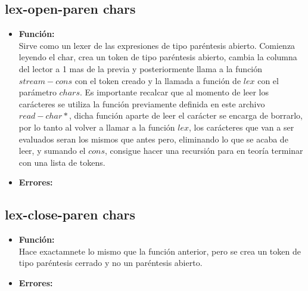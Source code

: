 \documentclass{article}
\begin{document}
\subsection{lex-open-paren chars}
\begin{itemize}
    \item \textbf{Función:} \\
    Sirve como un lexer de las expresiones de tipo paréntesis abierto. Comienza leyendo el char, crea un token de tipo paréntesis abierto, cambia la columna del lector a 1 mas de la previa y posteriormente llama a la función $stream-cons$ con el token creado y la llamada a función de $lex$ con el parámetro $chars$. Es importante recalcar que al momento de leer los carácteres se utiliza la función previamente definida en este archivo $read-char*$, dicha función aparte de leer el carácter se encarga de borrarlo, por lo tanto al volver a llamar a la función $lex$, los carácteres que van a ser evaluados seran los mismos que antes pero, eliminando lo que se acaba de leer, y sumando el $cons$, consigue hacer una recursión para en teoría terminar con una lista de tokens.
    \item \textbf{Errores:} \\ 
\end{itemize}
\subsection{lex-close-paren chars}
\begin{itemize}
    \item \textbf{Función:} \\
    Hace exactamnete lo mismo que la función anterior, pero se crea un token de tipo paréntesis cerrado y no un paréntesis abierto.
    \item \textbf{Errores:} \\ 
\end{itemize}
\end{document}
